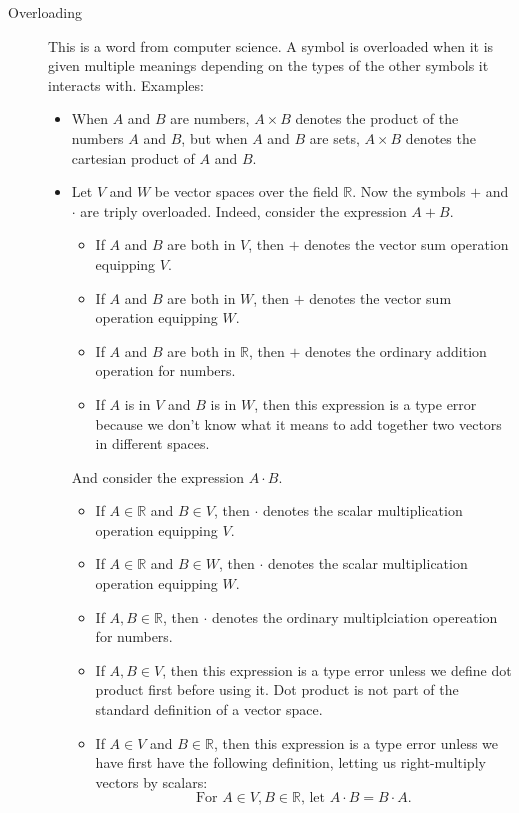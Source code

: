 \documentclass[12pt]{article}
\begin{document}
\begin{description}
  \item[Overloading] This is a word from computer science.  A symbol
    is overloaded when it is given multiple meanings depending on the
    types of the other symbols it interacts with.  Examples:
    \begin{itemize}
      \item When $A$ and $B$ are numbers, $A\times B$ denotes the
        product of the numbers $A$ and $B$, but when $A$ and $B$ are
        sets, $A\times B$ denotes the cartesian product of $A$ and
        $B$. 
      \item Let $V$ and $W$ be vector spaces over the field
        $\mathbb{R}$.  Now the symbols $+$ and $\cdot$ are triply
        overloaded.  Indeed, consider the expression $A+B$.
        \begin{itemize}
          \item If $A$ and $B$ are
            both in $V$, then $+$ denotes the vector sum operation
            equipping $V$. 
          \item If $A$ and $B$ are both in $W$, then $+$ denotes the
            vector sum operation equipping $W$. 
          \item If $A$ and $B$ are both in $\mathbb{R}$, then $+$
            denotes the ordinary addition operation for numbers. 
          \item If $A$ is in $V$ and $B$ is in $W$, then this
            expression is a type error because we don't know what it
            means to add together two vectors in different spaces. 
        \end{itemize}
        And consider the expression $A\cdot B$.
        \begin{itemize}
          \item If $A\in\mathbb{R}$ and $B\in V$, then $\cdot$ denotes
            the scalar multiplication operation equipping $V$. 
          \item If $A\in\mathbb{R}$ and $B\in W$, then $\cdot$ denotes
            the scalar multiplication operation equipping $W$. 
          \item If $A, B\in\mathbb{R}$, then $\cdot$ denotes
            the ordinary multiplciation opereation for numbers. 
          \item If $A,B\in V$, then this expression is a type error
            unless we define dot product first before using it.  Dot
            product is not part of the standard definition of a vector
            space. 
          \item If $A\in V$ and $B\in\mathbb{R}$, then this expression
            is a type error unless we have first have the following
            definition, letting us right-multiply vectors by scalars:
            $$\textrm{For }A\in V, B\in\mathbb{R}\textrm{, let }A\cdot
            B = B\cdot A\textrm{.}$$ 
        \end{itemize}
    \end{itemize}


\end{description}
\end{document}
